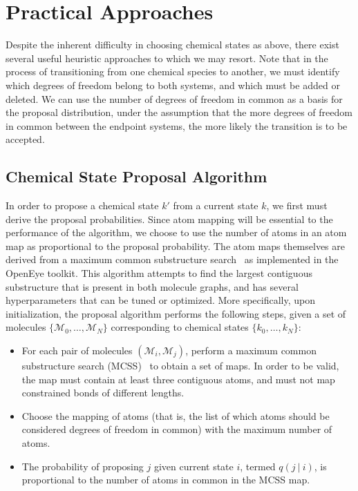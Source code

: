 \section{Practical Approaches}
%
Despite the inherent difficulty in choosing chemical states as above, there exist several useful heuristic approaches to which we may resort.
%
Note that in the process of transitioning from one chemical species to another, we must identify which degrees of freedom belong to both systems, and which must be added or deleted.
%
We can use the number of degrees of freedom in common as a basis for the proposal distribution, under the assumption that the more degrees of freedom in common between the endpoint systems, the more likely the transition is to be accepted.
%
\subsection{Chemical State Proposal Algorithm}
%
In order to propose a chemical state $k'$ from a current state $k$, we first must derive the proposal probabilities.
%
Since atom mapping will be essential to the performance of the algorithm, we choose to use the number of atoms in an atom map as proportional to the proposal probability.
%
The atom maps themselves are derived from a maximum common substructure search~\cite{Englert2015} as implemented in the OpenEye toolkit.
%
This algorithm attempts to find the largest contiguous substructure that is present in both molecule graphs,
and has several hyperparameters that can be tuned or optimized.
%
More specifically, upon initialization, the proposal algorithm performs the following steps, given a set of molecules $\{ \mathcal{M}_0, \ldots, \mathcal{M}_N\}$ corresponding to chemical states $\{k_0, \ldots, k_N\}$:
%
\begin{itemize}
    \item For each pair of molecules $(\mathcal{M}_i, \mathcal{M}_j)$, perform a maximum common substructure search (MCSS)~\cite{Englert2015} to obtain a set of maps. In order to be valid, the map must contain at least three contiguous atoms, and must not map constrained bonds of different lengths.
    \item Choose the mapping of atoms (that is, the list of which atoms should be considered degrees of freedom in common) with the maximum number of atoms.
    \item The probability of proposing $j$ given current state $i$, termed $q(j~|~i)$, is proportional to the number of atoms in common in the MCSS map.
\end{itemize}
